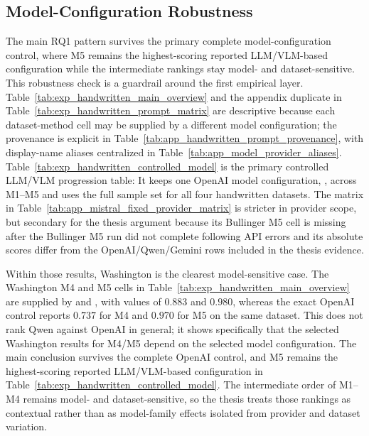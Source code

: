 \subsection{Model-Configuration Robustness}
\label{sec:experimentation_provider_model_robustness}

The main RQ1 pattern survives the primary complete model-configuration control, where M5 remains the highest-scoring reported LLM/VLM-based configuration while the intermediate rankings stay model- and dataset-sensitive. This robustness check is a guardrail around the first empirical layer. Table~\ref{tab:exp_handwritten_main_overview} and the appendix duplicate in Table~\ref{tab:exp_handwritten_prompt_matrix} are descriptive because each dataset-method cell may be supplied by a different model configuration; the provenance is explicit in Table~\ref{tab:app_handwritten_prompt_provenance}, with display-name aliases centralized in Table~\ref{tab:app_model_provider_aliases}. Table~\ref{tab:exp_handwritten_controlled_model} is the primary controlled LLM/VLM progression table: It keeps one OpenAI model configuration, \GPTFiveMarchShort{}, across M1--M5 and uses the full sample set for all four handwritten datasets. The \MistralLargeShort{} matrix in Table~\ref{tab:app_mistral_fixed_provider_matrix} is stricter in provider scope, but secondary for the thesis argument because its Bullinger M5 cell is missing after the Bullinger M5 run did not complete following API errors and its absolute scores differ from the OpenAI/Qwen/Gemini rows included in the thesis evidence.

Within those results, Washington is the clearest model-sensitive case. The Washington M4 and M5 cells in Table~\ref{tab:exp_handwritten_main_overview} are supplied by \QwenEightShort{} and \QwenThirtyTwoShort{}, with \LANormCombined{} values of \(0.883\) and \(0.980\), whereas the exact OpenAI control reports \(0.737\) for M4 and \(0.970\) for M5 on the same dataset. This does not rank Qwen against OpenAI in general; it shows specifically that the selected Washington results for M4/M5 depend on the selected model configuration. The main conclusion survives the complete OpenAI control, and M5 remains the highest-scoring reported LLM/VLM-based configuration in Table~\ref{tab:exp_handwritten_controlled_model}. The intermediate order of M1--M4 remains model- and dataset-sensitive, so the thesis treats those rankings as contextual rather than as model-family effects isolated from provider and dataset variation.

\FloatBarrier

